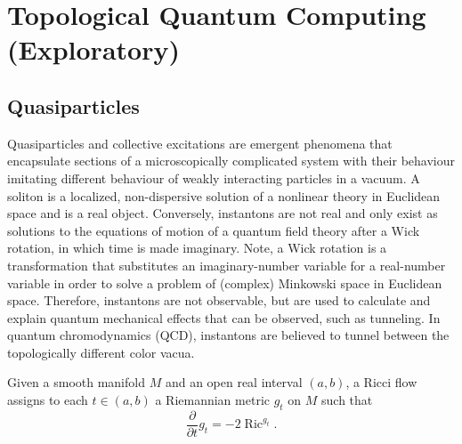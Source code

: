 \documentclass{article}
\begin{document}
    
    \section{Topological Quantum Computing (Exploratory)}

    \subsection{Quasiparticles}
    
    
    
    
    
    Quasiparticles and collective excitations are emergent phenomena that encapsulate sections of a microscopically complicated system with their behaviour imitating different behaviour of weakly interacting particles in a vacuum. 
    A soliton is a localized, non-dispersive solution of a nonlinear theory in Euclidean space and is a real object. Conversely, instantons are not real and only exist as solutions to the equations of motion of a quantum field theory after a Wick rotation, in which time is made imaginary. Note, a Wick rotation is a transformation that substitutes an imaginary-number variable for a real-number variable in order to solve a problem of (complex) Minkowski space in Euclidean space. Therefore, instantons are not observable, but are used to calculate and explain quantum mechanical effects that can be observed, such as tunneling. In quantum chromodynamics (QCD), instantons are believed to tunnel between the topologically different color vacua.
    
    Given a smooth manifold $M$ and an open real interval $(a,b)$, a Ricci flow assigns to each $t\in (a,b)$ a Riemannian metric $g_t$ on $M$ such that
    \begin{equation}
        {\displaystyle {\frac {\partial }{\partial t}}g_{t}=-2\operatorname {Ric} ^{g_{t}}.}
    \end{equation}
    
\end{document}
